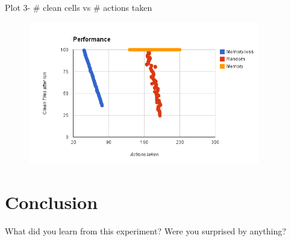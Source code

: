 \documentclass[a4paper,10pt]{article}
\begin{document}
Plot 3- \# clean cells vs \# actions taken
\begin{figure}[H]
	\includegraphics[width=0.9\textwidth]{image2.png}
\end{figure}

\section{Conclusion}
What did you learn from this experiment? Were you surprised by anything?
\end{document}
